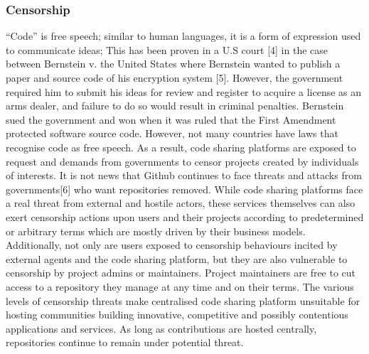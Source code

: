 \subsubsection{Censorship}
“Code” is free speech; similar to human languages, it is a form of expression used to communicate ideas; This has been proven in a U.S court [4] in the case between Bernstein v. the United States where Bernstein wanted to publish a paper and source code of his encryption system [5]. However, the government required him to submit his ideas for review and register to acquire a license as an arms dealer, and failure to do so would result in criminal penalties. Bernstein sued the government and won when it was ruled that the First Amendment protected software source code. However, not many countries have laws that recognise code as free speech. As a result, code sharing platforms are exposed to request and demands from governments to censor projects created by individuals of interests. It is not news that Github continues to face threats and attacks from governments[6] who want repositories removed.
While code sharing platforms face a real threat from external and hostile actors, these services themselves can also exert censorship actions upon users and their projects according to predetermined or arbitrary terms which are mostly driven by their business models. Additionally, not only are users exposed to censorship behaviours incited by external agents and the code sharing platform, but they are also vulnerable to censorship by project admins or maintainers. Project maintainers are free to cut access to a repository they manage at any time and on their terms.
The various levels of censorship threats make centralised code sharing platform unsuitable for hosting communities building innovative, competitive and possibly contentious applications and services. As long as contributions are hosted centrally, repositories continue to remain under potential threat.


